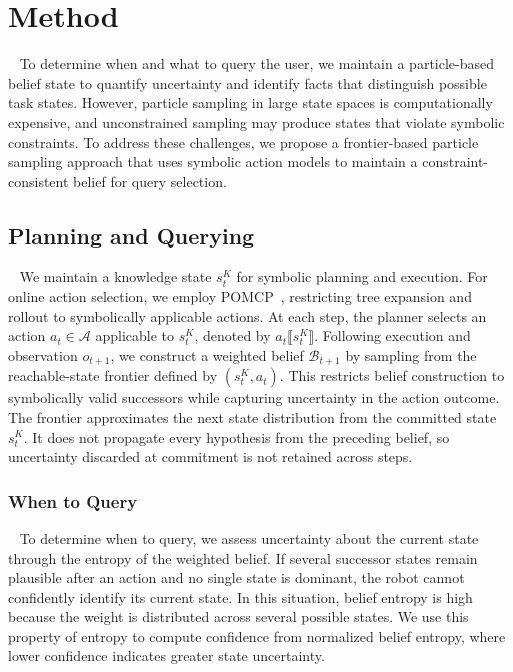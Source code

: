 
\section{Method}~\label{method:method}
To determine when and what to query the user, we maintain a particle-based belief state to quantify uncertainty and identify facts that distinguish possible task states. However, particle sampling in large state spaces is computationally expensive, and unconstrained sampling may produce states that violate symbolic constraints. To address these challenges, we propose a frontier-based particle sampling approach that uses symbolic action models to maintain a constraint-consistent belief for query selection.

\subsection{Planning and Querying}~\label{method:overview}\label{method:planning}\label{method:PM}
We maintain a knowledge state $s_t^{K}$ for symbolic planning and execution. For online action selection, we employ POMCP~\cite{silver2010monte}, restricting tree expansion and rollout to symbolically applicable actions. At each step, the planner selects an action $a_t\in\mathcal{A}$ applicable to $s_t^{K}$, denoted by $a_t\llbracket s_t^{K}\rrbracket$. Following execution and observation $o_{t+1}$, we construct a weighted belief $\mathcal{B}_{t+1}$ by sampling from the reachable-state frontier defined by $(s_t^{K},a_t)$. This restricts belief construction to symbolically valid successors while capturing uncertainty in the action outcome. The frontier approximates the next state distribution from the committed state $s_t^{K}$. It does not propagate every hypothesis from the preceding belief, so uncertainty discarded at commitment is not retained across steps.

\subsubsection{When to Query}~\label{method:when}\label{method:belief_rep}
To determine when to query, we assess uncertainty about the current state through the entropy of the weighted belief. If several successor states remain plausible after an action and no single state is dominant, the robot cannot confidently identify its current state. In this situation, belief entropy is high because the weight is distributed across several possible states. We use this property of entropy to compute confidence from normalized belief entropy, where lower confidence indicates greater state uncertainty.


